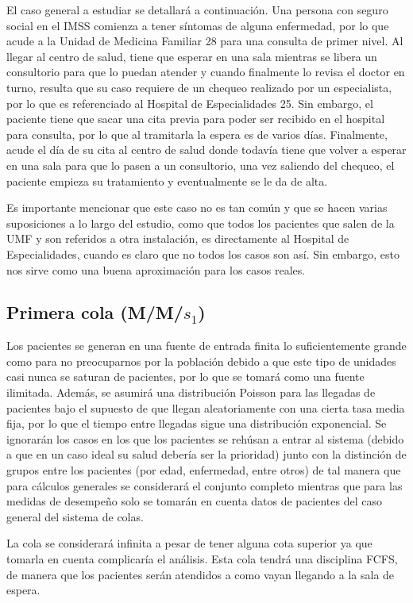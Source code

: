 \documentclass[10pt]{article}
\begin{document}
    El caso general a estudiar se detallará a continuación. Una persona con seguro social en el IMSS comienza a tener síntomas de alguna enfermedad, por lo que acude a la Unidad de Medicina Familiar 28 para una consulta de primer nivel. Al llegar al centro de salud, tiene que esperar en una sala mientras se libera un consultorio para que lo puedan atender y cuando finalmente lo revisa el doctor en turno, resulta que su caso requiere de un chequeo realizado por un especialista, por lo que es referenciado al Hospital de Especialidades 25. Sin embargo, el paciente tiene que sacar una cita previa para poder ser recibido en el hospital para consulta, por lo que al tramitarla la espera es de varios días. Finalmente, acude el día de su cita al centro de salud donde todavía tiene que volver a esperar en una sala para que lo pasen a un consultorio, una vez saliendo del chequeo, el paciente empieza su tratamiento y eventualmente se le da de alta.
    
    Es importante mencionar que este caso no es tan común y que se hacen varias suposiciones a lo largo del estudio, como que todos los pacientes que salen de la UMF y son referidos a otra instalación, es directamente al Hospital de Especialidades, cuando es claro que no todos los casos son así. Sin embargo, esto nos sirve como una buena aproximación para los casos reales.
    
    \subsection{Primera cola (M/M/$s_{1}$)}
    Los pacientes se generan en una fuente de entrada finita lo suficientemente grande como para no preocuparnos por la población debido a que este tipo de unidades casi nunca se saturan de pacientes, por lo que se tomará como una fuente ilimitada. Además, se asumirá una distribución Poisson para las llegadas de pacientes bajo el supuesto de que llegan aleatoriamente con una cierta tasa media fija, por lo que el tiempo entre llegadas sigue una distribución exponencial. Se ignorarán los casos en los que los pacientes se rehúsan a entrar al sistema (debido a que en un caso ideal su salud debería ser la prioridad) junto con la distinción de grupos entre los pacientes (por edad, enfermedad, entre otros) de tal manera que para cálculos generales se considerará el conjunto completo mientras que para las medidas de desempeño solo se tomarán en cuenta datos de pacientes del caso general del sistema de colas.
    
    La cola se considerará infinita a pesar de tener alguna cota superior ya que tomarla en cuenta complicaría el análisis. Esta cola tendrá una disciplina FCFS, de manera que los pacientes serán atendidos a como vayan llegando a la sala de espera.
    
\end{document}
